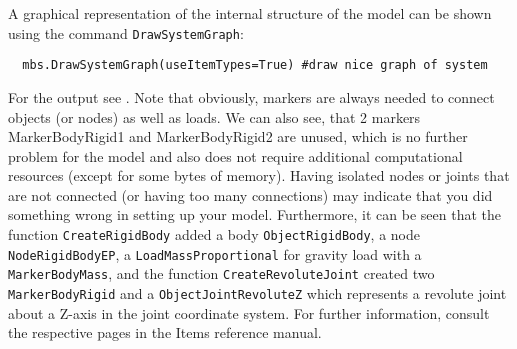 \noindent A graphical representation of the internal structure of the model can be shown using the command \texttt{DrawSystemGraph}:
\pythonstyle\begin{lstlisting}
  mbs.DrawSystemGraph(useItemTypes=True) #draw nice graph of system
\end{lstlisting}
For the output see . 
Note that obviously, markers are always needed to connect objects (or nodes) as well as loads. We can also see, that 2 markers MarkerBodyRigid1 and MarkerBodyRigid2 are unused, which is no further problem for the model and also does not require additional computational resources (except for some bytes of memory). Having isolated nodes or joints that are not connected (or having too many connections) may indicate that you did something wrong in setting up your model.
Furthermore, it can be seen that the function \texttt{CreateRigidBody} added a body \texttt{ObjectRigidBody}, a node \texttt{NodeRigidBodyEP}, a \texttt{LoadMassProportional} for gravity load with a \texttt{MarkerBodyMass}, and the function \texttt{CreateRevoluteJoint} created two \texttt{MarkerBodyRigid} and a \texttt{ObjectJointRevoluteZ} which represents a revolute joint about a Z-axis in the joint coordinate system. For further information, consult the respective pages in the Items reference manual.
%
%
%
%

